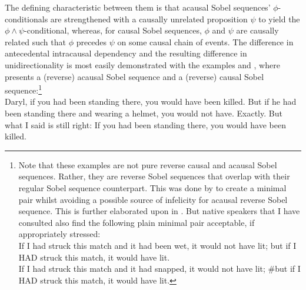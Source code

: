 The defining characteristic between them is that acausal Sobel sequences' $\phi$-conditionals are strengthened with a causally unrelated proposition $\psi$ to yield the $\phi\land\psi$-conditional, whereas, for causal Sobel sequences, $\phi$ and $\psi$ are causally related such that $\phi$ precedes $\psi$ on some causal chain of events. The difference in antecedental intracausal dependency and the resulting difference in unidirectionality is most easily demonstrated with the examples  and , where  presents a (reverse) acausal Sobel sequence and  a (reverse) causal Sobel sequence:\footnote{Note that these examples are not pure reverse causal and acausal Sobel sequences. Rather, they are reverse Sobel sequences that overlap with their regular Sobel sequence counterpart. This was done by \textcite{Klecha2014} to create a minimal pair whilst avoiding a possible source of infelicity for acausal reverse Sobel sequence. This is further elaborated upon in . But native speakers that I have consulted also find the following plain minimal pair acceptable, if appropriately stressed:\vspace{0mm}
\ex[exno=i] \\If I had struck this match and it had been wet, it would not have lit; but if I \MakeUppercase{had} struck this match, it would have lit.
\xe%
\ex[exno=ii] \\If I had struck this match and it had snapped, it would not have lit; \#but if I \MakeUppercase{had} struck this match, it would have lit.
\xe}\\
\pex{}%
			\a	{}Daryl, if you had been standing there, you would have been killed.
			\a	{}But if he had been standing there and wearing a helmet, you would not have.
			\a	{}Exactly. But what I said is still right:  If you had been
standing there, you would have been killed.\hfill\parencite[p. 152f]{Klecha2014}
\xe
\pex{}%
